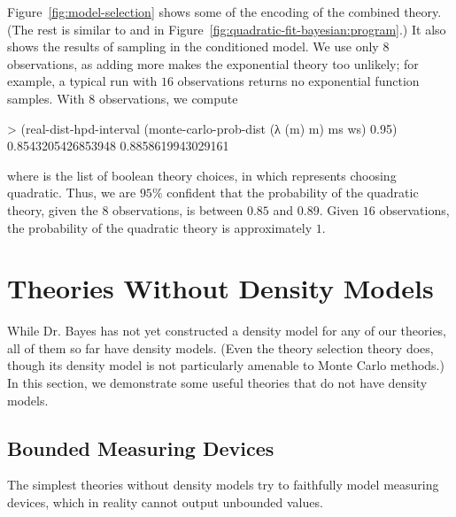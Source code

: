 Figure~\ref{fig:model-selection} shows some of the encoding of the combined theory.
(The rest is similar to  and  in Figure~\ref{fig:quadratic-fit-bayesian:program}.)
It also shows the results of sampling in the conditioned model.
We use only $8$ observations, as adding more makes the exponential theory too unlikely; for example, a typical run with $16$ observations returns no exponential function samples.
With $8$ observations, we compute
\begin{center}\singlespacing
\begin{schemedisplay}
> (real-dist-hpd-interval
   (monte-carlo-prob-dist (λ (m) m) ms ws)
   0.95)
0.8543205426853948
0.8858619943029161
\end{schemedisplay}
\end{center}
where  is the list of boolean theory choices, in which  represents choosing quadratic.
Thus, we are $95\%$ confident that the probability of the quadratic theory, given the $8$ observations, is between $0.85$ and $0.89$.
Given $16$ observations, the probability of the quadratic theory is approximately $1$.


\section{Theories Without Density Models}

While Dr. Bayes has not yet constructed a density model for any of our theories, all of them so far have density models.
(Even the theory selection theory does, though its density model is not particularly amenable to Monte Carlo methods.)
In this section, we demonstrate some useful theories that do not have density models.

\subsection{Bounded Measuring Devices}

The simplest theories without density models try to faithfully model measuring devices, which in reality cannot output unbounded values.

